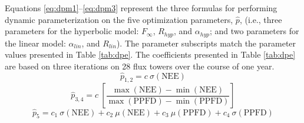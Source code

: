 Equations \ref{eq:dpm1}--\ref{eq:dpm3} represent the three formulas for performing dynamic parameterization on the five optimization parameters, $\hat{p}$, (i.e., three parameters for the hyperbolic model: $F_{\infty}$, $R_{hyp}$, and $\alpha_{hyp}$; and two parameters for the linear model: $\alpha_{lin}$, and $R_{lin}$).  
The parameter subscripts match the parameter values presented in Table \ref{tab:dpe}.  
The coefficients presented in Table \ref{tab:dpe} are based on three iterations on 28 flux towers over the course of one year.
\begin{equation}
\label{eq:dpm1}
    \hat{p}_{1,2} = c\: \sigma\left(\text{NEE}\right)
\end{equation}
\begin{equation}
\label{eq:dpm2}
    \hat{p}_{3,4} = c\: \left[
    \frac{\max\left(\text{NEE}\right)
    -\min\left(\text{NEE}\right)}{\max\left(\text{PPFD}\right)
    -\min\left(\text{PPFD}\right)}
    \right]
\end{equation}
\begin{equation}
\label{eq:dpm3}
    \hat{p}_{5} = c_{1}\: \sigma\left(\text{NEE}\right) 
    + c_{2}\: \mu\left(\text{NEE}\right) 
    + c_{3}\: \mu\left(\text{PPFD}\right) 
    + c_{4}\: \sigma\left(\text{PPFD}\right)
\end{equation}


